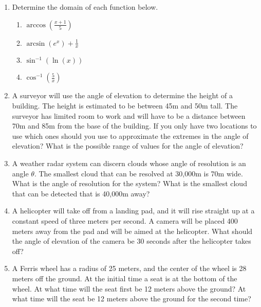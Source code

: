 
\begin{enumerate}
\item Determine the domain of each function below.
  \begin{enumerate}
  \item ${\displaystyle \arccos\left(\frac{x+1}{5}\right) }$
  \item ${\displaystyle \arcsin\left(e^x\right) + \frac{1}{x}}$
  \item ${\displaystyle \sin^{-1}\left( \ln(x) \right) }$
  \item ${\displaystyle \cos^{-1}\left( \frac{5}{x} \right)  }$
  \end{enumerate}
\item A surveyor will use the angle of elevation to determine the
  height of a building. The height is estimated to be between 45m and
  50m tall. The surveyor has limited room to work and will have to be
  a distance between 70m and 85m from the base of the building. If you
  only have two locations to use which ones should you use to
  approximate the extremes in the angle of elevation? What is the
  possible range of values for the angle of elevation?
\item A weather radar system can discern clouds whose angle of
  resolution is an angle $\theta$. The smallest cloud that can be
  resolved at 30,000m is 70m wide. What is the angle of resolution for
  the system? What is the smallest cloud that can be detected that is
  40,000m away?


\item A helicopter will take off from a landing pad, and it will rise
  straight up at a constant speed of three meters per second. A camera
  will be placed 400 meters away from the pad and will be aimed at the
  helicopter. What should the angle of elevation of the camera be 30
  seconds after the helicopter takes off?

\item A Ferris wheel has a radius of 25 meters, and the center of the
  wheel is 28 meters off the ground. At the initial time a seat is at
  the bottom of the wheel. At what time will the seat first be 12
  meters above the ground? At what time will the seat be 12 meters
  above the ground for the second time?

\end{enumerate}
